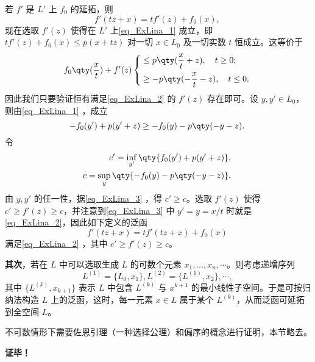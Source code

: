 若 $f'$ 是 $L'$ 上 $f_0$ 的延拓，则
\begin{equation}
f'(tz+x)=tf'(z)+f_0(x),~
\end{equation}
现在选取 $f'(z)$ 使得在 $L'$ 上\autoref{eq_ExLina_1} 成立，即 $tf'(z)+f_0(x)\leq p(x+tz)$ 对一切 $x\in L_0$ 及一切实数 $t$ 恒成立。这等价于
\begin{equation}\label{eq_ExLina_2}
f_0\qty(\frac{x}{t})+f'(z)\left\{\begin{aligned}
&\leq p\qty(\frac{x}{t}+z),\quad t\geq 0;\\
&\geq -p\qty(-\frac{x}{t}-z),\quad t\leq 0.
\end{aligned}\right.
~
\end{equation}
因此我们只要验证恒有满足\autoref{eq_ExLina_2} 的 $f'(z)$ 存在即可。设 $y,y'\in L_0$，则由\autoref{eq_ExLina_1} ，成立
\begin{equation}\label{eq_ExLina_3}
-f_0(y')+p(y'+z)\geq -f_0(y)-p\qty(-y-z).~
\end{equation}
 令 
 \begin{equation}
 \begin{aligned}
 c'=\inf_{y'}\qty{f_0(y')+p(y'+z)},\\
 c=\sup_y\qty{-f_0(y)-p\qty(-y-z)}.
 \end{aligned}~
 \end{equation}
 由 $y,y'$ 的任一性，据\autoref{eq_ExLina_3} ，得 $c'\geq c$。选取 $f'(z)$ 使得 $c'\geq f'(z)\geq c$，并注意到\autoref{eq_ExLina_3} 中 $y'=y=x/t$ 时就是\autoref{eq_ExLina_2}，因此如下定义的泛函 
 \begin{equation}
 f'(tz+x)=tf'(tz+x)+f_0(x)~
 \end{equation}
 满足\autoref{eq_ExLina_2} ，其中 $c'\geq f'(z)\geq c$。

\textbf{其次}，若在 $L$ 中可以选取生成 $L$ 的可数个元素 $x_1,\dots,x_n,\cdots$。则考虑递增序列
\begin{equation}
L^{(1)}=\{L_0,x_1\},L^{(2)}=\{L^{(1)},x_2\},\cdots,~
\end{equation}
其中 $\{L^{(k)},x_{k+1}\}$ 表示 $L$ 中包含 $L^{(k)}$ 与 $x^{k+1}$ 的最小线性子空间。于是可按归纳法构造 $L$ 上的泛函，这时，每一元素 $x\in L$ 属于某个 $L^{(k)}$，从而泛函可延拓到全空间 $L$。

不可数情形下需要佐恩引理（一种选择公理）和偏序的概念进行证明，本节略去。

\textbf{证毕！}



